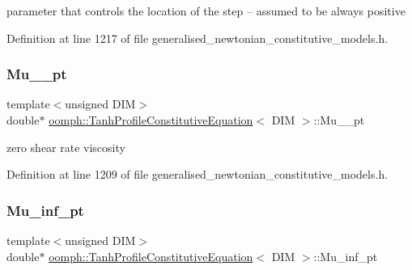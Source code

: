 parameter that controls the location of the step -- assumed to be always positive 

Definition at line 1217 of file generalised\+\_\+newtonian\+\_\+constitutive\+\_\+models.\+h.

\mbox{\label{classoomph_1_1TanhProfileConstitutiveEquation_a8b44ee78c6c9f700107300f1ac6c4652}} 
\subsubsection{\texorpdfstring{Mu\+\_\+\_\+pt}{Mu\_0\_pt}}
{\footnotesize\ttfamily template$<$unsigned D\+IM$>$ \\
double$\ast$ \hyperlink{classoomph_1_1TanhProfileConstitutiveEquation}{oomph\+::\+Tanh\+Profile\+Constitutive\+Equation}$<$ D\+IM $>$\+::Mu\+\_\+\_\+pt\hspace{0.3cm}{\ttfamily [private]}}



zero shear rate viscosity 



Definition at line 1209 of file generalised\+\_\+newtonian\+\_\+constitutive\+\_\+models.\+h.

\mbox{\label{classoomph_1_1TanhProfileConstitutiveEquation_a34b319c7b3280d633f2dcaccb728498f}} 
\subsubsection{\texorpdfstring{Mu\+\_\+inf\+\_\+pt}{Mu\_inf\_pt}}
{\footnotesize\ttfamily template$<$unsigned D\+IM$>$ \\
double$\ast$ \hyperlink{classoomph_1_1TanhProfileConstitutiveEquation}{oomph\+::\+Tanh\+Profile\+Constitutive\+Equation}$<$ D\+IM $>$\+::Mu\+\_\+inf\+\_\+pt\hspace{0.3cm}{\ttfamily [private]}}



